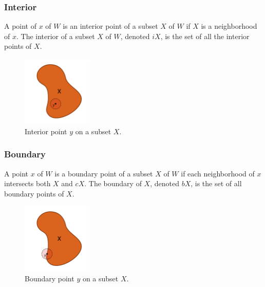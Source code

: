 \documentclass[a4paper,11pt,oneside]{article}
\begin{document}
\subsubsection{Interior}
     
\begin{definition}
	A point of $x$ of $W$ is an interior point of a subset $X$ of $W$ if $X$ is a neighborhood of $x$. The interior of a subset $X$ of $W$, denoted $iX$, is the set of all the interior points of $X$. \cite{Requicha1978MathematicalFO}
\end{definition}
     
\begin{figure}[ht]
	\begin{center}
		\includegraphics[width=0.3\textwidth]{section3/3.1/interior.png}
	\end{center}
	\caption{Interior point $y$ on a subset $X$.}
	\label{sect3:interior}
\end{figure}
    
\subsubsection{Boundary}
    
\begin{definition}
	A point $x$ of $W$ is a boundary point of a subset $X$ of $W$ if each neighborhood of $x$ intersects both $X$ and $cX$. The boundary of $X$, denoted $bX$, is the set of all boundary points of $X$. \cite{Requicha1978MathematicalFO}
\end{definition}
    
\begin{figure}[ht]
	\begin{center}
		\includegraphics[width=0.3\textwidth]{section3/3.1/boundary.png}
	\end{center}
	\caption{Boundary point $y$ on a subset $X$.}
	\label{sect3:boundary}
\end{figure}
    
\end{document}
